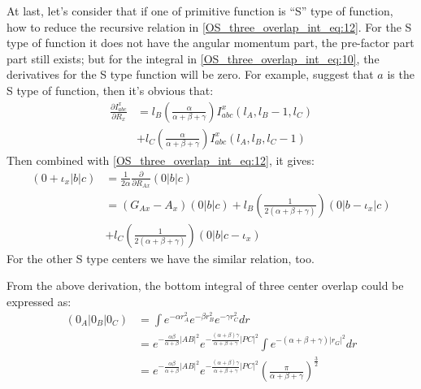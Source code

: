 At last, let's consider that if one of primitive function is ``S'' type of 
function, how to reduce the recursive relation in
\ref{OS_three_overlap_int_eq:12}. For the S type of function it does not have
the angular momentum part, the pre-factor part part still exists; but for the
integral in \ref{OS_three_overlap_int_eq:10}, the derivatives for the S type 
function will be zero. For example, suggest that $a$ is the S type of function,
then it's obvious that:
\begin{equation}
\begin{split}
 \frac{\partial I^{x}_{abc}}{\partial R_{x}} &= 
l_{B}\left(
\frac{\alpha}{\alpha+\beta+\gamma}\right)I^{x}_{abc}(l_{A},l_{B}-1,l_{C}) \\
&+ l_{C}\left(
\frac{\alpha}{\alpha+\beta+\gamma}\right)I^{x}_{abc}(l_{A},l_{B},l_{C}-1) 
\end{split}
 \label{OS_three_overlap_int_eq:13}
\end{equation}
Then combined with \ref{OS_three_overlap_int_eq:12}, it gives:
\begin{equation}
 \begin{split}
 (0+\iota_{x}|b|c) &= \frac{1}{2\alpha}\frac{\partial }{\partial R_{Ax}}(0|b|c) 
\\
&= (G_{Ax} - A_{x})(0|b|c) 
+ l_{B}\left(\frac{1}{2(\alpha+\beta+\gamma)}\right)(0|b-\iota_{x}|c) \\ 
&+ l_{C}\left(\frac{1}{2(\alpha+\beta+\gamma)}\right)(0|b|c-\iota_{x}) 
 \end{split}
\label{OS_three_overlap_int_eq:14}
\end{equation}
For the other S type centers we have the similar relation, too.

From the above derivation, the bottom integral of three center 
overlap could be expressed as:
\begin{equation}
 \begin{split}
  (0_{A}|0_{B}|0_{C}) &= \int e^{-\alpha r_{A}^{2}}e^{-\beta  r_{B}^{2}} 
             e^{-\gamma r_{C}^{2}}dr \\
          &= e^{-\frac{\alpha\beta}{\alpha+\beta}|AB|^{2}}
e^{-\frac{(\alpha+\beta)\gamma}{\alpha+\beta+\gamma}|PC|^{2}} 
\int e^{-(\alpha+\beta+\gamma)|r_{G}|^{2}} dr \\
          &= e^{-\frac{\alpha\beta}{\alpha+\beta}|AB|^{2}}
e^{-\frac{(\alpha+\beta)\gamma}{\alpha+\beta+\gamma}|PC|^{2}} 
\left( \frac{\pi}{\alpha+\beta+\gamma}\right)^{\frac{3}{2}} 
 \end{split}
 \label{OS_bottom_three_overlap_int_1}
\end{equation}

